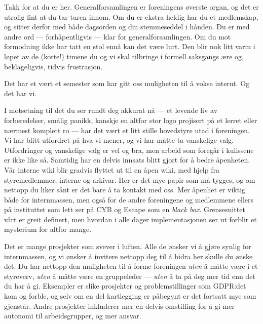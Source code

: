 \documentclass[10pt,norsk,a4paper]{article}
\begin{document}
\begin{multicols}{2}
Takk for at du er her. Generalforsamlingen er foreningens øverste organ, og det er utrolig fint at du tar turen innom. Om du er ekstra heldig har du et medlemskap, og sitter derfor med både dagsorden og din stemmeseddel i hånden. Du er med andre ord --- forhåpentligvis --- klar for generalforsamlingen. Om du mot formodning ikke har tatt en stol ennå kan det være lurt. Den blir nok litt varm i løpet av de (korte!) timene du og vi skal tilbringe i formell saksgangs ære og, beklageligvis, tidvis frustrasjon.

Det har et vært et semester som har gitt oss muligheten til å vokse internt. Og det har vi.

I motsetning til det du ser rundt deg akkurat nå --- et levende liv av forberedelser, smålig panikk, kanskje en altfor stor logo projisert på et lerret eller nærmest komplett ro --- har det vært et litt stille hovedstyre utad i foreningen. Vi har blitt utfordret på hva vi mener, og vi har måtte ta vanskelige valg. Utfordringer og vanskelige valg er vel og bra, men arbeid som foregår i kulissene er ikke like så. Samtidig har en delvis innsats blitt gjort for å bedre åpenheten. Vår interne wiki blir gradvis flyttet ut til en åpen wiki, med hjelp fra styremedlemmer, interne og arkivar. Her er det mye papir som må tygges, og om nettopp du liker sånt er det bare å ta kontakt med oss. Mer åpenhet er viktig både for internmassen, men også for de andre foreningene og medlemmene ellers på instituttet som lett ser på CYB og Escape som en \textit{black box}. Grensesnittet vårt er greit definert, men hvordan i alle dager implementasjonen ser ut forblir et mysterium for altfor mange.

Det er mange prosjekter som svever i luften. Alle de ønsker vi å gjøre synlig for internmassen, og vi ønsker å invitere nettopp deg til å bidra her skulle du ønske det. Du har nettopp den muligheten til å forme foreningen \textit{uten} å måtte være i et styreverv, \textit{uten} å måtte være en gruppeleder --- \textit{uten} å ta på deg mer tid enn det du har å gi. Eksempler er slike prosjekter og problemstillinger som GDPR:\@ det kom og forble, og selv om en del kartlegging er påbegynt er det fortsatt mye som gjenstår. Andre prosjekter inkluderer mer en delvis omstilling for å gi mer autonomi til arbeidsgrupper, og mer ansvar.


\end{multicols}
\end{document}
